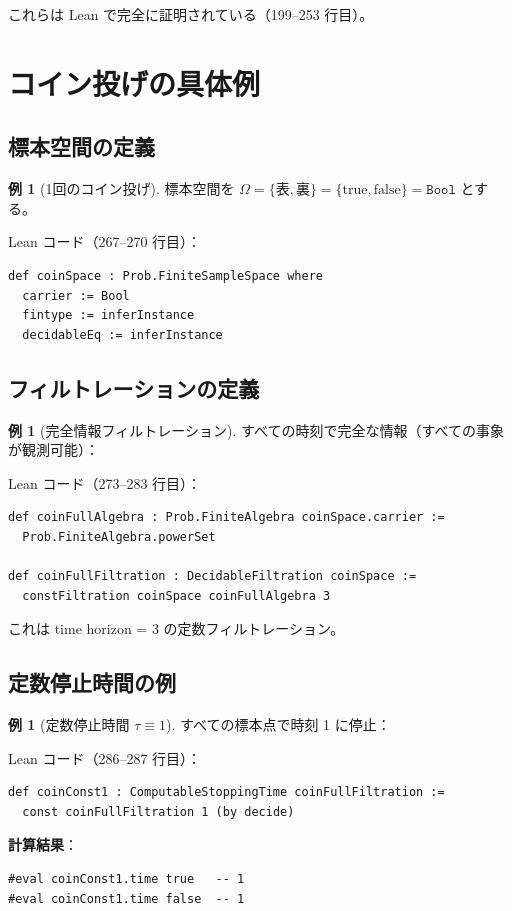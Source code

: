 \documentclass[12pt,a4paper,ja=standard]{bxjsarticle}
\theoremstyle{definition}
\newtheorem{example}[definition]{例}
\begin{document}
これらは Lean で完全に証明されている（199--253 行目）。

\section{コイン投げの具体例}\label{sec:examples}

\subsection{標本空間の定義}

\begin{example}[1回のコイン投げ]
標本空間を $\Omega = \{\text{表}, \text{裏}\} = \{\text{true}, \text{false}\} = \mathtt{Bool}$ とする。

Lean コード（267--270 行目）：
\begin{verbatim}
def coinSpace : Prob.FiniteSampleSpace where
  carrier := Bool
  fintype := inferInstance
  decidableEq := inferInstance
\end{verbatim}
\end{example}

\subsection{フィルトレーションの定義}

\begin{example}[完全情報フィルトレーション]
すべての時刻で完全な情報（すべての事象が観測可能）：

Lean コード（273--283 行目）：
\begin{verbatim}
def coinFullAlgebra : Prob.FiniteAlgebra coinSpace.carrier :=
  Prob.FiniteAlgebra.powerSet

def coinFullFiltration : DecidableFiltration coinSpace :=
  constFiltration coinSpace coinFullAlgebra 3
\end{verbatim}

これは time horizon = 3 の定数フィルトレーション。
\end{example}

\subsection{定数停止時間の例}

\begin{example}[定数停止時間 $\tau \equiv 1$]
すべての標本点で時刻 1 に停止：

Lean コード（286--287 行目）：
\begin{verbatim}
def coinConst1 : ComputableStoppingTime coinFullFiltration :=
  const coinFullFiltration 1 (by decide)
\end{verbatim}

\textbf{計算結果}：
\begin{verbatim}
#eval coinConst1.time true   -- 1
#eval coinConst1.time false  -- 1
\end{verbatim}
\end{example}
\end{document}
